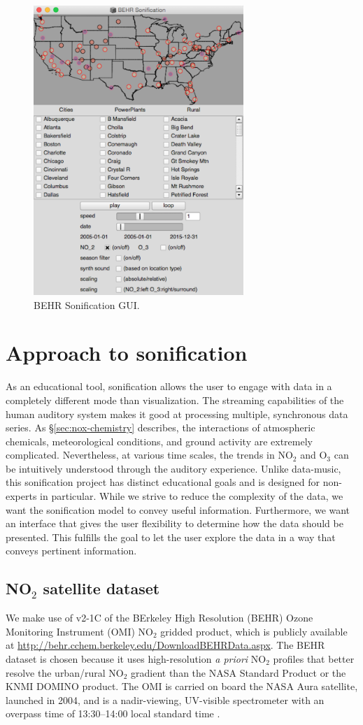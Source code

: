 \documentclass[a4paper,10pt,oneside]{article}
\newcommand{\ce}[1]{$\mathrm{#1}$}
\begin{document}
\begin{sloppy}
\begin{figure}[t]
\centering
\includegraphics[width=300px]{figs/gui.png}
\caption{BEHR Sonification GUI.}
\label{fig:gui}
\end{figure}

\section{Approach to sonification}
As an educational tool, sonification allows the user to engage with data in a completely different mode than visualization. The streaming capabilities of the human auditory system makes it good at processing multiple, synchronous data series. As \S \ref{sec:nox-chemistry} describes, the interactions of atmospheric chemicals, meteorological conditions, and ground activity are extremely complicated. Nevertheless, at various time scales, the trends in \ce{NO_2} and \ce{O_3} can be intuitively understood through the auditory experience. Unlike data-music, this sonification project has distinct educational goals and is designed for non-experts in particular. While we strive to reduce the complexity of the data, we want the sonification model to convey useful information.  Furthermore, we want an interface that gives the user flexibility to determine how the data should be presented.  This fulfills the goal to let the user explore the data in a way that conveys pertinent information.  

\subsection{NO$_2$ satellite dataset}
	We make use of v2-1C of the BErkeley High Resolution (BEHR) Ozone Monitoring Instrument (OMI) \ce{NO_2} gridded product, which is publicly available at \url{http://behr.cchem.berkeley.edu/DownloadBEHRData.aspx}. The BEHR dataset is chosen because it uses high-resolution \emph{a priori} \ce{NO_2} profiles that better resolve the urban/rural \ce{NO_2} gradient than the NASA Standard Product or the KNMI DOMINO product. The OMI is carried on board the NASA Aura satellite, launched in 2004, and is a nadir-viewing, UV-visible spectrometer with an overpass time of 13:30--14:00 local standard time \cite{levelt06}.
	

\end{sloppy}
\end{document}
